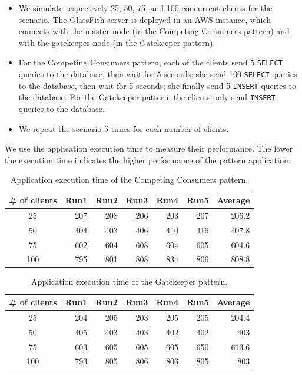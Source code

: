 \documentclass{article}
\begin{document}
\begin{itemize}
\item We simulate respectively 25, 50, 75, and 100 concurrent clients for the scenario. The GlassFish server is deployed in an AWS instance, which connects with the master node (in the Competing Consumers pattern) and with the gatekeeper node (in the Gatekeeper pattern).
\item For the Competing Consumers pattern, each of the clients send 5 \texttt{SELECT} queries to the database, then wait for 5 seconds; she send 100 \texttt{SELECT} queries to the database, then wait for 5 seconds; she finally send 5 \texttt{INSERT} queries to the database. For the Gatekeeper pattern, the clients only send \texttt{INSERT} queries to the database.
\item We repeat the scenario 5 times for each number of clients.
\end{itemize}

We use the application execution time to measure their performance. The lower the execution time indicates the higher performance of the pattern application.


\begin{table}[t]
    \centering
    \caption{Application execution time of the Competing Consumers pattern.}
    \label{tab:ccp_performance}
    \begin{tabular}{|c|r|r|r|r|r|r|}
        \hline
        \textbf{\# of clients} & \textbf{Run1} & \textbf{Run2} & \textbf{Run3} & \textbf{Run4} & \textbf{Run5} & \textbf{Average}\\ \hline
        25 & 207 & 208 & 206 & 203 & 207 & 206.2 \\ \hline 
        50 & 404 & 403 & 406 & 410 & 416 & 407.8 \\ \hline
        75 & 602 & 604 & 608 & 604 & 605 & 604.6 \\ \hline
        100 & 795 & 801 & 808 & 834 & 806 & 808.8 \\ \hline
	\end{tabular}
\end{table}

\begin{table}[]
    \centering
    \caption{Application execution time of the Gatekeeper pattern.}
    \label{tab:gatekeeper_performance}
    \begin{tabular}{|c|r|r|r|r|r|r|}
        \hline
        \textbf{\# of clients} & \textbf{Run1} & \textbf{Run2} & \textbf{Run3} & \textbf{Run4} & \textbf{Run5} & \textbf{Average}\\ \hline
        25 & 204 & 205 & 203 & 205 & 205 & 204.4 \\ \hline 
        50 & 405 & 403 & 403 & 402 & 402 & 403 \\ \hline
        75 & 603 & 605 & 605 & 605 & 650 & 613.6 \\ \hline
        100 & 793 & 805 & 806 & 806 & 805 & 803 \\ \hline
	\end{tabular}
\end{table}
\end{document}
